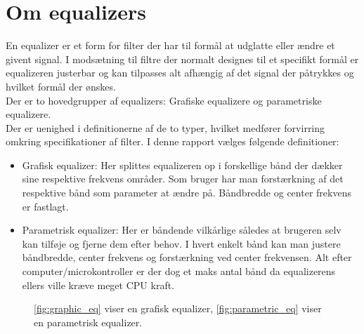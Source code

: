 \section{Om equalizers}\label{sec:equalizer}

En equalizer er et form for filter der har til formål at udglatte eller ændre et givent signal. I modsætning til filtre der normalt designes til et specifikt formål er equalizeren justerbar og kan tilpasses alt afhængig af det signal der påtrykkes og hvilket formål der ønskes.\\

Der er to hovedgrupper af equalizers: Grafiske equalizere og parametriske equalizere.\\
Der er uenighed i definitionerne af de to typer, hvilket medfører forvirring omkring specifikationer af filter. I denne rapport vælges følgende definitioner:

\begin{itemize}
	\item Grafisk equalizer: Her splittes equalizeren op i forskellige bånd der dækker sine respektive frekvens områder. Som bruger har man forstærkning af det respektive bånd som parameter at ændre på. Båndbredde og center frekvens er fastlagt.
	\item Parametrisk equalizer: Her er båndende vilkårlige således at brugeren selv kan tilføje og fjerne dem efter behov. I hvert enkelt bånd kan man justere båndbredde, center frekvens og forstærkning ved center frekvensen. Alt efter computer/microkontroller er der dog et maks antal bånd da equalizerens ellers ville kræve meget CPU kraft. 
\end{itemize}  


\begin{figure}[h]
	\centering
  	\caption{\ref{fig:graphic_eq} viser en grafisk equalizer, \ref{fig:parametric_eq} viser en parametrisk equalizer.}
	\label{fig:om_eq}
\end{figure}
\FloatBlock

